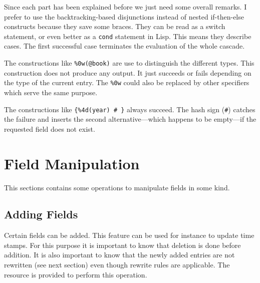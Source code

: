 \documentclass[11pt,a4paper]{scrbook}
\begin{document}
Since each part has been explained before we just need some overall remarks. I
prefer to use the backtracking-based disjunctions instead of nested
if-then-else constructs because they save some braces. They can be read as a
switch statement, or even better as a \texttt{cond} statement in Lisp. This
means they describe cases. The first successful case terminates the evaluation
of the whole cascade.

The constructions like \verb|%0w(@book)| are use to distinguish the different
types. This construction does not produce any output. It just succeeds or
fails depending on the type of the current entry. The \verb|%0w| could also
be replaced by other specifiers which serve the same purpose.

The constructions like \verb|{%4d(year) # }| always succeed. The hash sign
(\verb|#|) catches the failure and inserts the second alternative---which
happens to be empty---if the requested field does not exist.


\begin{Summary}
\end{Summary}

\section{Field Manipulation}

This sections contains some operations to manipulate fields in some kind.

\subsection{Adding Fields}

Certain fields can be added. This feature can be used for instance
to update time stamps. For this purpose it is important to know that deletion
is done before addition. It is also important to know that the newly added
entries are not rewritten (see next section) even though rewrite rules are
applicable. The resource  is provided to perform this
operation.
\end{document}

